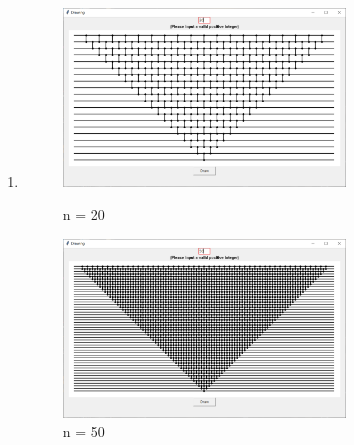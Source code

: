 \documentclass[12pt,a4paper]{article}
\makeatletter
\newtheorem*{solution}{Solution}
\theoremstyle{definition}
\renewenvironment{solution}[1][Solution] {\par\pushQED{\qed}\normalfont\topsep6\p@\@plus6\p@\relax\trivlist\item[\hskip\labelsep\bfseries#1\@addpunct{.}]\ignorespaces}{\popQED\endtrivlist\@endpefalse} \makeatother
\makeatother
\begin{document}
\begin{enumerate}
\begin{solution}
\begin{enumerate}
\begin{figure}[H]
\centering
\begin{minipage}[t]{0.48\textwidth}
\centering
\includegraphics[width=7.5cm]{n=20.png}
\caption{n = 20}
\end{minipage}
\begin{minipage}[t]{0.48\textwidth}
\centering
\includegraphics[width=7.5cm]{n=50.png}
\caption{n = 50}
\end{minipage}
\end{figure}


\end{enumerate}


\end{solution}
\end{enumerate}

\end{document}
